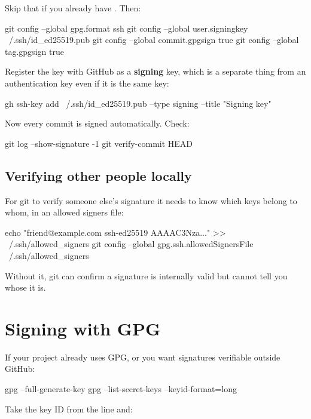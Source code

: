 \documentclass[11pt]{article}
\begin{document}
Skip that if you already have . Then:

\begin{shell}
git config --global gpg.format ssh
git config --global user.signingkey ~/.ssh/id_ed25519.pub
git config --global commit.gpgsign true
git config --global tag.gpgsign true
\end{shell}

Register the key with GitHub as a \textbf{signing} key, which is a separate thing
from an authentication key even if it is the same key:

\begin{shell}
gh ssh-key add ~/.ssh/id_ed25519.pub --type signing --title "Signing key"
\end{shell}

Now every commit is signed automatically. Check:

\begin{shell}
git log --show-signature -1
git verify-commit HEAD
\end{shell}

\subsection{Verifying other people locally}

For git to verify someone else's signature it needs to know which keys belong to
whom, in an allowed signers file:

\begin{shell}
echo "friend@example.com ssh-ed25519 AAAAC3Nza..." >> ~/.ssh/allowed_signers
git config --global gpg.ssh.allowedSignersFile ~/.ssh/allowed_signers
\end{shell}

Without it, git can confirm a signature is internally valid but cannot tell you
whose it is.

\section{Signing with GPG}

If your project already uses GPG, or you want signatures verifiable outside GitHub:

\begin{shell}
gpg --full-generate-key
gpg --list-secret-keys --keyid-format=long
\end{shell}

Take the key ID from the  line and:
\end{document}
